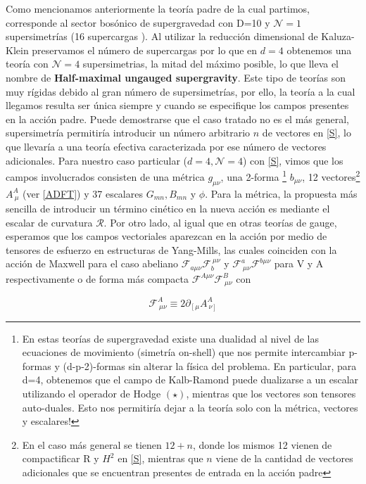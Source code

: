 \documentclass{article}
\numberwithin{equation}{section}
\begin{document}
Como mencionamos anteriormente la teoría padre de la cual partimos, corresponde al sector bosónico de supergravedad con D=10 y $ \mathcal{N}=1 $ supersimetrías (16 supercargas ). Al utilizar la reducción dimensional de Kaluza-Klein preservamos el número de supercargas por lo que en $ d=4 $ obtenemos una teoría con $ \mathcal{N}=4 $ supersimetrias, la mitad del máximo posible, lo que lleva el nombre de \textbf{Half-maximal ungauged supergravity}. Este tipo de teorías son muy rígidas debido al gran número de supersimetrías, por ello, la teoría a la cual llegamos resulta ser única siempre y cuando se especifique los campos presentes en la acción padre. Puede demostrarse que el caso tratado no es el más general, supersimetría permitiría introducir un número arbitrario $ n $ de vectores en \ref{S}, lo que llevaría a una teoría efectiva caracterizada por ese número de vectores adicionales. Para nuestro caso particular ($ d=4, \mathcal{N}=4 $) con \ref{S}, vimos que los campos involucrados consisten de una métrica $ g_{\mu \nu} $, una 2-forma
\footnote{En estas teorías de supergravedad existe una dualidad al nivel de las ecuaciones de movimiento (simetría on-shell) que nos permite intercambiar p-formas y (d-p-2)-formas sin alterar la física del problema. En particular, para d=4, obtenemos que el campo de Kalb-Ramond puede dualizarse a un escalar utilizando el operador de Hodge $ (\star) $, mientras que los vectores son tensores auto-duales. Esto nos permitiría dejar a la teoría solo con la métrica, vectores y escalares!}
$ b_{\mu \nu} $, 12 vectores\footnote{En el caso más general se tienen $ 12 + n $, donde los mismos 12 vienen de compactificar R y $ H^2 $ en \ref{S}, mientras que $ n $ viene de la cantidad de vectores adicionales que se encuentran presentes de entrada en la acción padre } 
$ A_{\ \mu}^A $ (ver \ref{ADFT}) y 37 escalares $ G_{m n}, B_{m n} $ y $ \phi $. Para la métrica, la propuesta más sencilla de introducir un término cinético en la nueva acción es mediante el escalar de curvatura $ \mathcal{R} $. Por otro lado, al igual que en otras teorías de gauge, esperamos que los campos vectoriales aparezcan en la acción por medio de tensores de esfuerzo en estructuras de Yang-Mills, las cuales coinciden con la acción de Maxwell para el caso abeliano $ \mathcal{F}_{a \mu \nu} \mathcal{F}_b^{\ \mu \nu} $ y $ \mathcal{F}^a_{\ \mu \nu} \mathcal{F}^{b \mu \nu} $ para V y A respectivamente o de forma más compacta $ \mathcal{F}^{A \mu \nu} \mathcal{F}^B_{\ \mu \nu} $ con

\begin{equation}\label{F}
\mathcal{F}^A_{\ \mu \nu} \equiv 2 \partial_{\left[\mu\right.}A^A_{\ \left.\nu\right]}
\end{equation}
\end{document}
